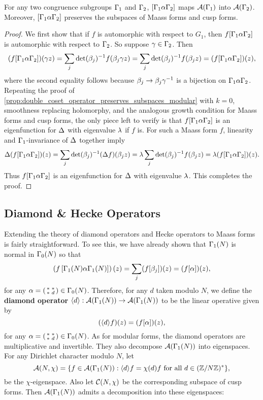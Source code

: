       \begin{proposition}\label{prop:double_coset_operator_preserves_subspaces_Maass}
        For any two congruence subgroups $\Gamma_{1}$ and $\Gamma_{2}$, $[\Gamma_{1}\alpha\Gamma_{2}]$ maps $\mathcal{A}(\Gamma_{1})$ into $\mathcal{A}(\Gamma_{2})$. Moreover, $[\Gamma_{1}\alpha\Gamma_{2}]$ preserves the subspaces of Maass forms and cusp forms.
      \end{proposition}
      \begin{proof}
        We first show that if $f$ is automorphic with respect to $G_{1}$, then $f[\Gamma_{1}\alpha\Gamma_{2}]$ is automorphic with respect to $\Gamma_{2}$. So suppose $\gamma \in \Gamma_{2}$. Then
        \[
          (f[\Gamma_{1}\alpha\Gamma_{2}])(\gamma z) = \sum_{j}\det(\beta_{j})^{-1}f(\beta_{j}\gamma z) = \sum_{j}\det(\beta_{j})^{-1}f(\beta_{j}z) = (f[\Gamma_{1}\alpha\Gamma_{2}])(z),
        \]
        where the second equality follows because $\beta_{j} \to \beta_{j}\gamma^{-1}$ is a bijection on $\Gamma_{1}\alpha\Gamma_{2}$. Repeating the proof of \cref{prop:double_coset_operator_preserves_subspaces_modular} with $k = 0$, smoothness replacing holomorphy, and the analogous growth condition for Maass forms and cusp forms, the only piece left to verify is that $f[\Gamma_{1}\alpha\Gamma_{2}]$ is an eigenfunction for $\Delta$ with eigenvalue $\lambda$ if $f$ is. For such a Maass form $f$, linearity and $\Gamma_{1}$-invariance of $\Delta$ together imply
        \[
          \Delta(f[\Gamma_{1}\alpha\Gamma_{2}])(z) = \sum_{j}\det(\beta_{j})^{-1}(\Delta f)(\beta_{j}z) = \lambda\sum_{j}\det(\beta_{j})^{-1}f(\beta_{j}z) = \lambda(f[\Gamma_{1}\alpha\Gamma_{2}])(z). 
        \]
        Thus $f[\Gamma_{1}\alpha\Gamma_{2}]$ is an eigenfunction for $\Delta$ with eigenvalue $\lambda$. This completes the proof.
      \end{proof}
    \subsection*{Diamond \& Hecke Operators}
      Extending the theory of diamond operators and Hecke operators to Maass forms is fairly straightforward. To see this, we have already shown that $\Gamma_{1}(N)$ is normal in $\Gamma_{0}(N)$ so that
      \[
        \left(f\left[\Gamma_{1}(N)\alpha\Gamma_{1}(N)\right]\right)(z) = \sum_{j}(f[\beta_{j}])(z) = (f[\alpha])(z),
      \]
      for any $\alpha = \begin{psmallmatrix} \ast & \ast \\ \ast & d \end{psmallmatrix} \in \Gamma_{0}(N)$. Therefore, for any $d$ taken modulo $N$, we define the \textbf{diamond operator} $\langle d\rangle:\mathcal{A}(\Gamma_{1}(N)) \to \mathcal{A}(\Gamma_{1}(N))$ to be the linear operative given by
      \[
        (\langle d\rangle f)(z) = (f[\alpha])(z),
      \]
      for any $\alpha = \begin{psmallmatrix} \ast & \ast \\ \ast & d \end{psmallmatrix} \in \Gamma_{0}(N)$. As for modular forms, the diamond operators are multiplicative and invertible. They also decompose $\mathcal{A}(\Gamma_{1}(N))$ into eigenspaces. For any Dirichlet character modulo $N$, let
      \[
        \mathcal{A}(N,\chi) = \{f \in \mathcal{A}(\Gamma_{1}(N)):\langle d\rangle f = \chi(d)f \text{ for all } d \in (\mathbb{Z}/N\mathbb{Z})^{\ast}\},
      \]
      be the $\chi$-eigenspace. Also let $\mathcal{C}(N,\chi)$ be the corresponding subspace of cusp forms. Then $\mathcal{A}(\Gamma_{1}(N))$ admits a decomposition into these eigenspaces:

